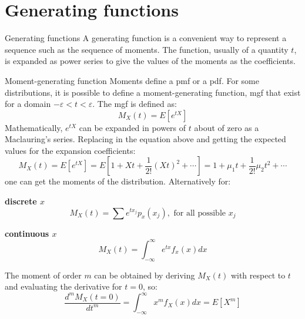 \documentclass[8pt]{beamer}
\renewcommand{\emph}[1]{\textcolor{myorange}{#1}}
\begin{document}
\section{Generating functions}
\begin{frame}{Generating functions}
    A \alert{generating function} is a convenient way to represent a sequence such as the sequence of moments. The function, usually of a quantity $t$, is expanded as \emph{power series} to give the values of the moments as the coefficients. 

    \begin{block}{Moment-generating function}
        \emph{Moments} define a \emph{pmf} or a \emph{pdf}. For some distributions, it is possible to define a \alert{moment-generating function}, \alert{mgf} that exist for a domain $-\varepsilon < t < \varepsilon$. The \emph{mgf} is defined as:
        \[
            M_X (t)  = E[e^{tX}]
        \]
        Mathematically, $e^{tX}$ can be expanded in powers of $t$ about of zero as a Maclauring's series. Replacing in the equation above and getting the expected values for the expansion coefficients:
\[
    M_X (t)  = E[e^{tX}] = E \left[ 1 + Xt + \frac{1}{2!} (Xt)^2 + \cdots \right] = 1 + \mu_1 t + \frac{1}{2!}\mu_2 t^2 + \cdots 
        \]
        one can get the moments of the distribution. Alternatively for:
\begin{minipage}[t]{0.44\textwidth}
\centering
\textbf{discrete $x$}
\[
    M_X (t) = \sum e^{t x_j} p_x (x_j), \text{ for all possible $x_j$}
\]
\end{minipage}
\begin{minipage}[t]{0.44\textwidth}
\centering
\textbf{continuous $x$}
\[
    M_X (t) = \int_{-\infty}^{\infty} e^{t x} f_x (x) dx
\]

\end{minipage}

The moment of order $m$ can be obtained by deriving $M_X (t)$ with respect to $t$ and evaluating the derivative for $t=0$, so:
\[
    \frac{d^m M_X (t=0)}{d t^m} = \int_{-\infty}^{\infty} x^m f_X (x) dx = E[X^m]
\]

    \end{block}
\end{frame}
\end{document}
